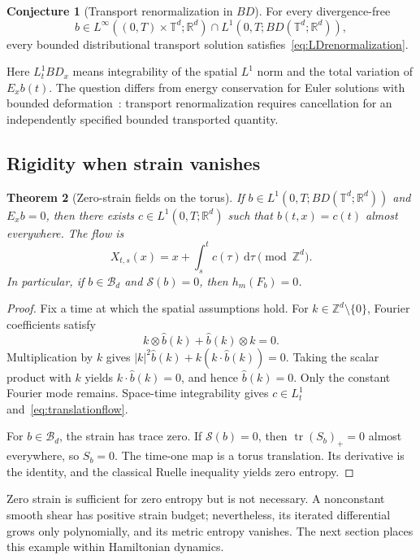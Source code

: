 \documentclass[review,12pt,times,a4paper,nopreprintline]{elsarticle}
\theoremstyle{plain}
\newtheorem{theorem}{Theorem}[section]
\theoremstyle{definition}
\newtheorem{conjecture}[theorem]{Conjecture}
\theoremstyle{remark}
\newcommand{\T}{\mathbb T}
\newcommand{\R}{\mathbb R}
\newcommand{\Z}{\mathbb Z}
\newcommand{\B}{\mathscr B}
\newcommand{\dd}{\,\mathrm d}
\newcommand{\tr}{\operatorname{tr}}
\newcommand{\action}{\mathcal S}
\numberwithin{equation}{section}
\begin{document}
\begin{conjecture}[Transport renormalization in $BD$]\label{conj:BD}
For every divergence-free
\[
 b\in L^\infty((0,T)\times\T^d;\R^d)\cap L^1(0,T;BD(\T^d;\R^d)),
\]
every bounded distributional transport solution satisfies~\eqref{eq:LDrenormalization}.
\end{conjecture}
Here $L^1_tBD_x$ means integrability of the spatial $L^1$ norm and the total variation of $E_xb(t)$. The question differs from energy conservation for Euler solutions with bounded deformation~\cite{Inversi}: transport renormalization requires cancellation for an independently specified bounded transported quantity.

\subsection{Rigidity when strain vanishes}
\begin{theorem}[Zero-strain fields on the torus]\label{thm:zerostrain}
If $b\in L^1(0,T;BD(\T^d;\R^d))$ and $E_xb=0$, then there exists $c\in L^1(0,T;\R^d)$ such that $b(t,x)=c(t)$ almost everywhere. The flow is
\begin{equation}\label{eq:translationflow}
 X_{t,s}(x)=x+\int_s^tc(\tau)\dd\tau\pmod{\Z^d}.
\end{equation}
In particular, if $b\in\B_d$ and $\action(b)=0$, then $h_m(F_b)=0$.
\end{theorem}
\begin{proof}
Fix a time at which the spatial assumptions hold. For $k\in\Z^d\setminus\{0\}$, Fourier coefficients satisfy
\[
 k\otimes\widehat b(k)+\widehat b(k)\otimes k=0.
\]
Multiplication by $k$ gives $|k|^2\widehat b(k)+k(k\cdot\widehat b(k))=0$. Taking the scalar product with $k$ yields $k\cdot\widehat b(k)=0$, and hence $\widehat b(k)=0$. Only the constant Fourier mode remains. Space-time integrability gives $c\in L^1_t$ and~\eqref{eq:translationflow}.

For $b\in\B_d$, the strain has trace zero. If $\action(b)=0$, then $\tr(S_b)_+=0$ almost everywhere, so $S_b=0$. The time-one map is a torus translation. Its derivative is the identity, and the classical Ruelle inequality yields zero entropy.
\end{proof}

Zero strain is sufficient for zero entropy but is not necessary. A nonconstant smooth shear has positive strain budget; nevertheless, its iterated differential grows only polynomially, and its metric entropy vanishes. The next section places this example within Hamiltonian dynamics.
\end{document}

